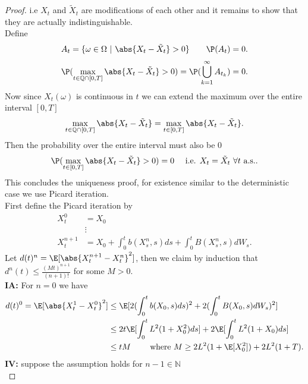\begin{proof}
 i.e $X_t$ and $\tilde{X}_t $ are modifications of each other and it remains to show that they are actually
 indistinguishable.\\[1ex]
 Define 
 \begin{align*}
  A_t = \{ \omega  \in  \Omega  \ | \ \abs{X_t - \tilde{X}_t  } > 0\}   \qquad \P(A_t) = 0
 .\end{align*}
 \begin{align*}
   \P(\max_{t \in  \mathbb{Q} \cap [0,T]} \abs{X_t-\tilde{X}_t } > 0 ) = \P(\bigcup_{k=1}^{\infty} A_{t_k} ) = 0
 .\end{align*}
 Now since $X_t(\omega )$ is continuous in $t$ we can extend the maximum over the entire interval $[0,T]$ 
 \begin{align*}
   \max_{t \in  \mathbb{Q} \cap [0,T]} \abs{X_t - \tilde{X}_t} = \max_{t \in  [0,T]} \abs{X_t - \tilde{X}_t}
 .\end{align*}
 Then the probability over the entire interval must also be 0 
 \begin{align*}
   \P(\max_{t \in  [0,T]} \abs{X_t - \tilde{X}_t} >0)  = 0 \quad \text{ i.e. } X_t = \tilde{X}_t \ \forall  t \text{ a.s.} 
 .\end{align*}
 This concludes the uniqueness proof, for existence similar to the deterministic case we use Picard iteration.\\[1ex]
 First define the Picard iteration by  
 \begin{align*}
   X_t^{0} &= X_0  \\
           &\vdots\\
   X_t^{n+1} &= X_0 + \int_0^{t} b(X_s^{n},s ) ds + \int_0^{t} B(X_s^{n},s ) dW_s   
 .\end{align*}
 Let $d(t)^{n} = \E[\abs{X_t^{n+1}-X_t^{n}}^2] $, then we claim by induction that $d^{n}(t) \le  \frac{(Mt)^{n+1} }{(n+1)!} $ for some $M>0$.\\
  \textbf{IA:} For $n=0$ we have
  \begin{align*}
    d(t)^{0} = \E[\abs{X_t^1-X_t^0}^2] &\le  \E[2 (\int_0^{t} b(X_0,s) ds )^2 + 2 (\int_0^{t} B(X_0,s )dW_s )^2]  \\
                                       &\le  2t \E[\int_0^{t} L^2(1+X_{0}^2) ds ] + 2\E[\int_0^{t} L^2(1+X_{0}) ds ] \\
                                       &\le  tM \qquad \text{ where } M\ge 2L^2(1+\E[X_{0}^2]) +2L^2(1+T)
  .\end{align*}
  \textbf{IV:} suppose the assumption holds for $n-1 \in  \mathbb{N}$\\

\end{proof}
